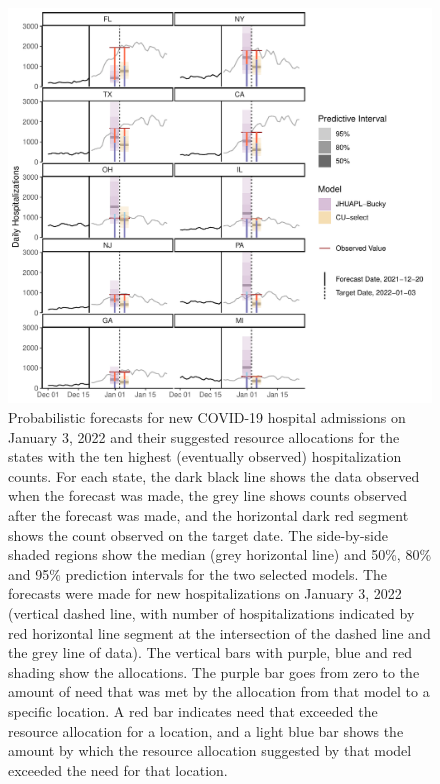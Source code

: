 \documentclass{article}\usepackage[]{graphicx}\usepackage[]{xcolor}
\makeatletter
\def\maxwidth{ %
  \ifdim\Gin@nat@width>\linewidth
    \linewidth
  \else
    \Gin@nat@width
  \fi
}
\newenvironment{knitrout}{}{} %
\makeatother
\begin{document}
\begin{knitrout}
\color{fgcolor}\begin{figure}[H]
\includegraphics[width=\maxwidth]{figure/thermometer-plot-1} \caption[Probabilistic forecasts for new COVID-19 hospital admissions on January 3, 2022 and their suggested resource allocations for the states with the ten highest (eventually observed) hospitalization counts]{Probabilistic forecasts for new COVID-19 hospital admissions on January 3, 2022 and their suggested resource allocations for the states with the ten highest (eventually observed) hospitalization counts. For each state, the dark black line shows the data observed when the forecast was made, the grey line shows counts observed after the forecast was made, and the horizontal dark red segment shows the count observed on the target date. The side-by-side shaded regions show the median (grey horizontal line) and 50\%, 80\% and 95\% prediction intervals for the two selected models. The forecasts were made for new hospitalizations on January 3, 2022 (vertical dashed line, with number of hospitalizations indicated by red horizontal line segment at the intersection of the dashed line and the grey line of data). The vertical bars with purple, blue and red shading show the allocations. The purple bar goes from zero to the amount of need that was met by the allocation from that model to a specific location. A red bar indicates need that exceeded the resource allocation for a location, and a light blue bar shows the amount by which the resource allocation suggested by that model exceeded the need for that location.}\label{fig:thermometer-plot}
\end{figure}

\end{knitrout}
\end{document}
